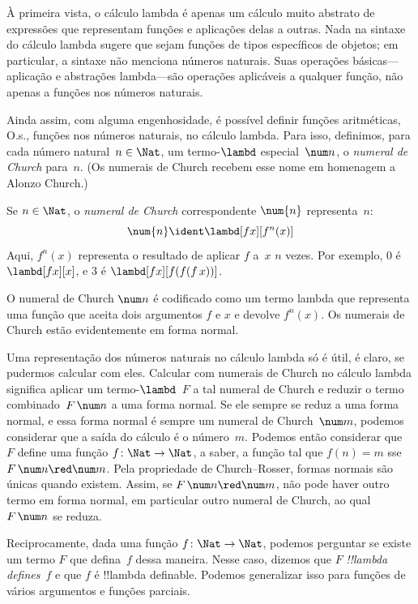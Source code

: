 \documentclass[../../../include/open-logic-section]{subfiles}
\begin{document}

À primeira vista, o cálculo lambda é apenas um cálculo muito abstrato de
expressões que representam funções e aplicações delas a outras. Nada na
sintaxe do cálculo lambda sugere que sejam funções de tipos específicos de
objetos; em particular, a sintaxe não menciona números naturais. Suas
operações básicas---aplicação e abstrações lambda---são operações aplicáveis
a qualquer função, não apenas a funções nos números naturais.

Ainda assim, com alguma engenhosidade, é possível definir funções
aritméticas, O.s.\@, funções nos números naturais, no cálculo lambda. Para
isso, definimos, para cada número natural~$n \in \Nat$, um termo-$\lambd$
especial~$\num n$, o \emph{numeral de Church} para~$n$. (Os numerais de
Church recebem esse nome em homenagem a Alonzo Church.)

\begin{defn}
  Se $n \in \Nat$, o \emph{numeral de Church} correspondente $\num{n}$
  representa~$n$:
  \[
    \num{n} \ident \lambd[fx][f^n(x)]
  \]
  Aqui, $f^n(x)$ representa o resultado de aplicar $f$ a~$x$ $n$ vezes. Por
  exemplo, $\num{0}$ é $\lambd[fx][x]$, e $\num{3}$ é
  $\lambd[fx][f(f(f\,x))]$.
\end{defn}
  
O numeral de Church $\num n$ é codificado como um termo lambda que
representa uma função que aceita dois argumentos $f$ e $x$ e devolve
$f^n(x)$. Os numerais de Church estão evidentemente em forma normal.

Uma representação dos números naturais no cálculo lambda só é útil, é
claro, se pudermos calcular com eles. Calcular com numerais de Church no
cálculo lambda significa aplicar um termo-$\lambd$~$F$ a tal numeral de
Church e reduzir o termo combinado~$F\, \num n$ a uma forma normal. Se ele
sempre se reduz a uma forma normal, e essa forma normal é sempre um numeral
de Church~$\num m$, podemos considerar que a saída do cálculo é o número~$m$.
Podemos então considerar que~$F$ define uma função
$f\colon \Nat \to \Nat$, a saber, a função tal que $f(n) = m$ sse
$F\, \num n \red \num m$. Pela propriedade de Church--Rosser, formas
normais são únicas quando existem. Assim, se $F\, \num n \red \num m$, não
pode haver outro termo em forma normal, em particular outro numeral de
Church, ao qual $F \, \num n$ se reduza.

Reciprocamente, dada uma função $f\colon \Nat \to \Nat$, podemos perguntar
se existe um termo $F$ que defina~$f$ dessa maneira. Nesse caso, dizemos que
$F$ \emph{!!{lambda define}s}~$f$ e que $f$ é !!{lambda definable}. Podemos
generalizar isso para funções de vários argumentos e funções parciais.
\end{document}
